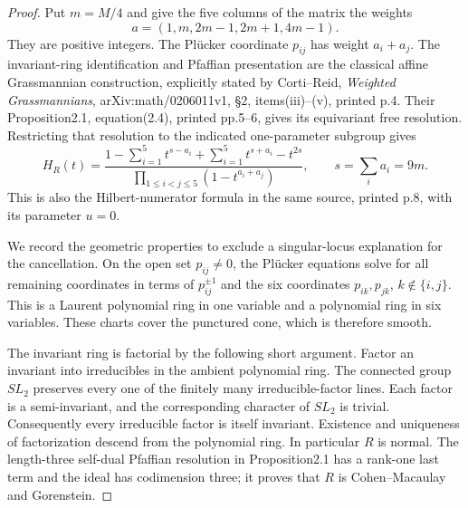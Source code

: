 \begin{proof}
Put $m=M/4$ and give the five columns of the matrix the weights
\[
             a=(1,m,2m-1,2m+1,4m-1).                    \tag{K-022a}
\]
They are positive integers.  The Pl\"ucker coordinate $p_{ij}$
has weight $a_i+a_j$.  The invariant-ring identification and
Pfaffian presentation are the classical affine Grassmannian
construction, explicitly stated by Corti--Reid,
\emph{Weighted Grassmannians}, arXiv:math/0206011v1, \S2,
items(iii)--(v), printed p.4.  Their Proposition2.1, equation(2.4),
printed pp.5--6, gives its equivariant free resolution.  Restricting
that resolution to the indicated one-parameter subgroup gives
\[
 H_R(t)=
 \frac{1-\sum_{i=1}^5t^{s-a_i}+\sum_{i=1}^5t^{s+a_i}-t^{2s}}
      {\prod_{1\le i<j\le5}(1-t^{a_i+a_j})},
 \qquad s=\sum_i a_i=9m.                                \tag{K-022b}
\]
This is also the Hilbert-numerator formula in the same source,
printed p.8, with its parameter $u=0$.

We record the geometric properties to exclude a singular-locus
explanation for the cancellation.  On the open set $p_{ij}\ne0$,
the Pl\"ucker equations solve for all remaining coordinates in
terms of $p_{ij}^{\pm1}$ and the six coordinates $p_{ik},p_{jk}$,
$k\notin\{i,j\}$.  This is a Laurent polynomial ring in one
variable and a polynomial ring in six variables.  These charts
cover the punctured cone, which is therefore smooth.

The invariant ring is factorial by the following short argument.
Factor an invariant into irreducibles in the ambient polynomial
ring.  The connected group $SL_2$ preserves every one of the
finitely many irreducible-factor lines.  Each factor is a
semi-invariant, and the corresponding character of $SL_2$ is
trivial.  Consequently every irreducible factor is itself
invariant.  Existence and uniqueness of factorization descend
from the polynomial ring.  In particular $R$ is normal.
The length-three self-dual Pfaffian resolution in Proposition2.1
has a rank-one last term and the ideal has codimension three;
it proves that $R$ is Cohen--Macaulay and Gorenstein.


\end{proof}
